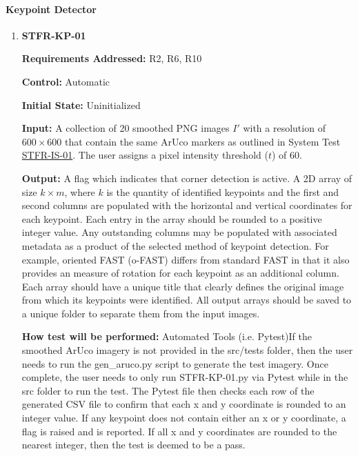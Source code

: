 \documentclass[12pt, titlepage]{article}
\begin{document}
\paragraph{Keypoint Detector}
\begin{enumerate}
\item \hypertarget{STFR-KP-01}{\textbf{STFR-KP-01}\\}
\textbf{Requirements Addressed:} R2, R6, R10

\textbf{Control:} Automatic	

\textbf{Initial State:} Uninitialized			

\textbf{Input:} A collection of 20 smoothed PNG images $I'$ with a resolution of $600\times 600$ that 
contain the same ArUco markers as outlined in System Test \hyperlink{STFR-IS-01}{STFR-IS-01}. The user assigns a pixel intensity threshold ($t$) of 60.

\textbf{Output:} A flag which indicates that corner detection is active. 
A 2D array of size ${k \times m}$, where $k$ is the quantity of identified keypoints and the first and second columns are populated with the horizontal and vertical coordinates for each keypoint. Each entry in the array should be rounded to a positive integer value. Any outstanding columns may be populated with associated metadata as a product of the selected method of keypoint detection. For example, oriented FAST (o-FAST) differs from standard FAST in that it also provides an measure of rotation for each keypoint as an additional column. Each array should have a unique title that clearly defines the original image from which its keypoints were identified. All output arrays should be saved to a unique folder to separate them from the input images.

\textbf{How test will be performed:} Automated Tools (i.e. Pytest)If the smoothed ArUco imagery is not provided in the src/tests folder, then the user needs to run the gen\_aruco.py script to generate the test imagery. Once complete, the user needs to only run STFR-KP-01.py via Pytest while in the src folder to run the test. The Pytest file then checks each row of the generated CSV file to confirm that each x and y coordinate is rounded to an integer value. If any keypoint does not contain either an x or y coordinate, a flag is raised and is reported. If all x and y coordinates are rounded to the nearest integer, then the test is deemed to be a pass.
\end{enumerate}
\end{document}
